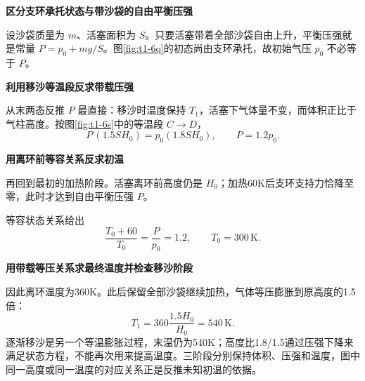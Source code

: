 \begin{solution}\textbf{区分支环承托状态与带沙袋的自由平衡压强}\par\nobreak
设沙袋质量为 $m$、活塞面积为 $S$。只要活塞带着全部沙袋自由上升，平衡压强就是常量 $P=p_0+mg/S$。图\ref{fig:t1-6q}的初态尚由支环承托，故初始气压 $p_0$ 不必等于 $P$。


\par\medskip{}\noindent\textbf{利用移沙等温段反求带载压强}\par\nobreak
从末两态反推 $P$ 最直接：移沙时温度保持 $T_1$，活塞下气体量不变，而体积正比于气柱高度。按图\ref{fig:t1-6s}中的等温段 $C\to D$，
\[P\,(1.5SH_0)=p_0(1.8SH_0),\qquad P=1.2p_0.\]


\par\medskip{}\noindent\textbf{用离环前等容关系反求初温}\par\nobreak
再回到最初的加热阶段。活塞离环前高度仍是 $H_0$；加热60K后支环支持力恰降至零，此时才达到自由平衡压强 $P$。

等容状态关系给出
\[\frac{T_0+60}{T_0}=\frac P{p_0}=1.2,\qquad \boxed{T_0=300\,\mathrm K}.\]


\par\medskip{}\noindent\textbf{用带载等压关系求最终温度并检查移沙阶段}\par\nobreak
因此离环温度为360K。此后保留全部沙袋继续加热，气体等压膨胀到原高度的1.5倍：
\[\boxed{T_1=360\frac{1.5H_0}{H_0}=540\,\mathrm K}.\]
逐渐移沙是另一个等温膨胀过程，末温仍为540K；高度比1.8/1.5通过压强下降来满足状态方程，不能再次用来提高温度。三阶段分别保持体积、压强和温度，图中同一高度或同一温度的对应关系正是反推未知初温的依据。
\end{solution}
